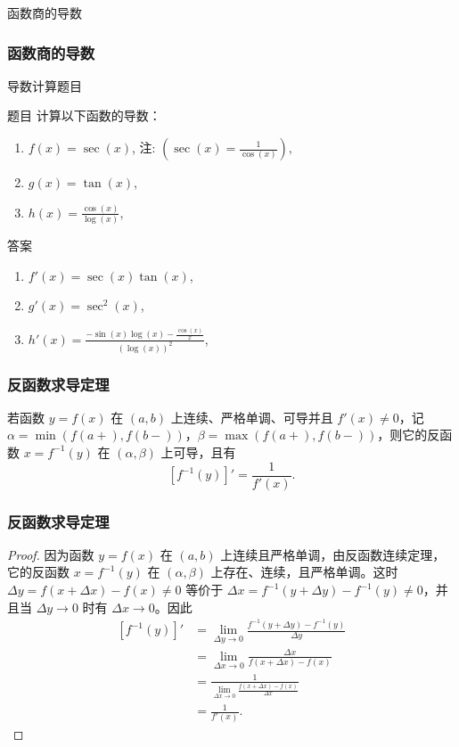 \documentclass[
10pt,
aspectratio=43,
]{beamer}
\begin{document}
\begin{frame}{函数商的导数}
	\frametitle{函数商的导数}{导数计算题目}
	\begin{exampleblock}{题目}
		计算以下函数的导数：
		\begin{enumerate}
			\item $f(x) = \sec(x)$, 注: $\left(\sec(x)=\displaystyle\frac{1}{\cos(x)}\right),$
			\item $g(x) = \tan(x)$,
			\item $h(x) = \displaystyle\frac{\cos(x)}{\log(x)}$,
		\end{enumerate}
	\end{exampleblock}

	\pause

	\begin{exampleblock}{答案}
		\begin{enumerate}
			\item $f'(x) = \sec(x) \tan(x)$,
			\item $g'(x) = \sec^2(x)$,
			\item $h'(x) = \displaystyle\frac{-\sin(x)\log(x)-\displaystyle\frac{\cos(x)}{x}}{(\log(x))^2}$,
		\end{enumerate}
	\end{exampleblock}
\end{frame}

\begin{frame}
	\frametitle{反函数求导定理}
	\begin{theorem}[定理 4.3.4]
		若函数 $y=f(x)$ 在 $(a, b)$ 上连续、严格单调、可导并且 $f'(x) \neq 0$，记 $\alpha=\min(f(a+), f(b-))$，$\beta=\max(f(a+), f(b-))$，则它的反函数 $x=f^{-1}(y)$ 在 $(\alpha, \beta)$ 上可导，且有
		\[
			\left[f^{-1}(y)\right]' = \frac{1}{f'(x)}.
		\]
	\end{theorem}
\end{frame}

\begin{frame}
	\frametitle{反函数求导定理}
	\begin{proof}
		因为函数 $y=f(x)$ 在 $(a, b)$ 上连续且严格单调，由反函数连续定理，它的反函数 $x=f^{-1}(y)$ 在 $(\alpha, \beta)$ 上存在、连续，且严格单调。这时 $\Delta y=f(x+\Delta x)-f(x) \neq 0$ 等价于 $\Delta x=f^{-1}(y+\Delta y)-f^{-1}(y) \neq 0$，并且当 $\Delta y \rightarrow 0$ 时有 $\Delta x \rightarrow 0$。因此
		\[
			\begin{aligned}
				\left[f^{-1}(y)\right]' & = \lim_{\Delta y \rightarrow 0} \frac{f^{-1}(y+\Delta y)-f^{-1}(y)}{\Delta y} \\
				                        & = \lim_{\Delta x \rightarrow 0} \frac{\Delta x}{f(x+\Delta x)-f(x)}           \\
				                        & = \frac{1}{\lim_{\Delta x \rightarrow 0} \frac{f(x+\Delta x)-f(x)}{\Delta x}} \\
				                        & = \frac{1}{f'(x)}.
			\end{aligned}
		\]
	\end{proof}
\end{frame}
\end{document}
